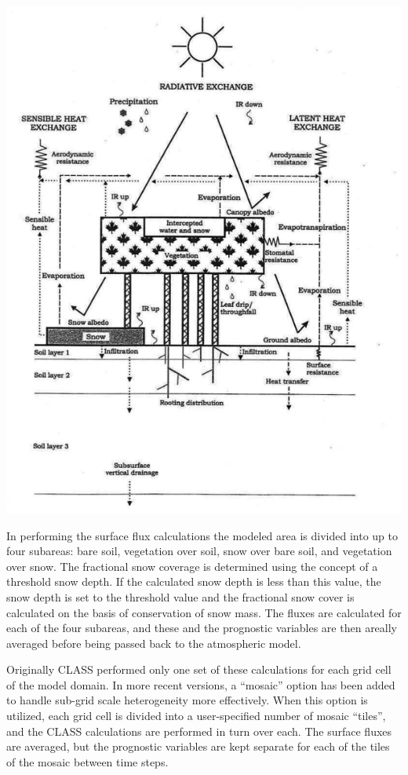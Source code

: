 \begin{DoxyImage}
\includegraphics[width=\textwidth,height=\textheight/2,keepaspectratio=true]{schematicDiagramOfClass.png}
\caption{Schematic Diagram Of C\+L\+A\+S\+S}
\end{DoxyImage}
 In performing the surface flux calculations the modeled area is divided into up to four subareas\+: bare soil, vegetation over soil, snow over bare soil, and vegetation over snow. The fractional snow coverage is determined using the concept of a threshold snow depth. If the calculated snow depth is less than this value, the snow depth is set to the threshold value and the fractional snow cover is calculated on the basis of conservation of snow mass. The fluxes are calculated for each of the four subareas, and these and the prognostic variables are then areally averaged before being passed back to the atmospheric model.

Originally C\+L\+A\+S\+S performed only one set of these calculations for each grid cell of the model domain. In more recent versions, a “mosaic” option has been added to handle sub-\/grid scale heterogeneity more effectively. When this option is utilized, each grid cell is divided into a user-\/specified number of mosaic “tiles”, and the C\+L\+A\+S\+S calculations are performed in turn over each. The surface fluxes are averaged, but the prognostic variables are kept separate for each of the tiles of the mosaic between time steps.

